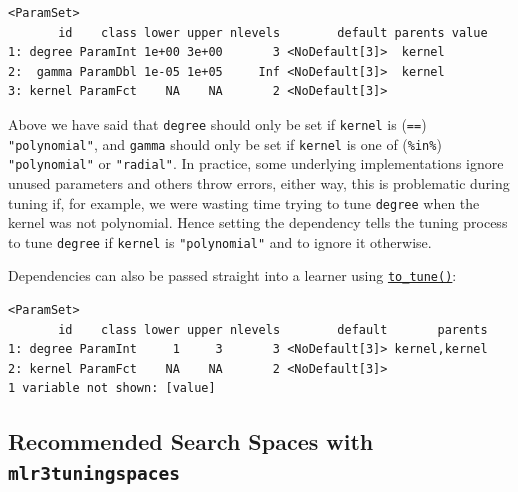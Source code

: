 \begin{verbatim}
<ParamSet>
       id    class lower upper nlevels        default parents value
1: degree ParamInt 1e+00 3e+00       3 <NoDefault[3]>  kernel      
2:  gamma ParamDbl 1e-05 1e+05     Inf <NoDefault[3]>  kernel      
3: kernel ParamFct    NA    NA       2 <NoDefault[3]>              
\end{verbatim}

Above we have said that \texttt{degree} should only be set if
\texttt{kernel} is (\texttt{==}) \texttt{"polynomial"}, and
\texttt{gamma} should only be set if \texttt{kernel} is one of
(\texttt{\%in\%}) \texttt{"polynomial"} or \texttt{"radial"}. In
practice, some underlying implementations ignore unused parameters and
others throw errors, either way, this is problematic during tuning if,
for example, we were wasting time trying to tune \texttt{degree} when
the kernel was not polynomial. Hence setting the dependency tells the
tuning process to tune \texttt{degree} if \texttt{kernel} is
\texttt{"polynomial"} and to ignore it otherwise.

Dependencies can also be passed straight into a learner using
\href{https://paradox.mlr-org.com/reference/to_tune.html}{\texttt{to\_tune()}}:

\begin{Shaded}
\begin{Highlighting}[]
\NormalTok{(}\NormalTok{,}
   \NormalTok{(}\NormalTok{(}\NormalTok{, }\NormalTok{)),}
   \NormalTok{(}\NormalTok{(}\NormalTok{, }\NormalTok{, }\SpecialCharTok{==} \NormalTok{)))}
\NormalTok{)}\SpecialCharTok{$}\SpecialCharTok{$}\NormalTok{()}
\end{Highlighting}
\end{Shaded}

\begin{verbatim}
<ParamSet>
       id    class lower upper nlevels        default       parents
1: degree ParamInt     1     3       3 <NoDefault[3]> kernel,kernel
2: kernel ParamFct    NA    NA       2 <NoDefault[3]>              
1 variable not shown: [value]
\end{verbatim}

\hypertarget{sec-tuning-spaces}{%
\subsection{\texorpdfstring{Recommended Search Spaces with
\texttt{mlr3tuningspaces}}{Recommended Search Spaces with mlr3tuningspaces}}\label{sec-tuning-spaces}}

